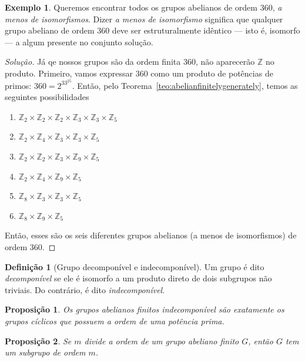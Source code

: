 \documentclass[a4paper,12pt]{report}
\theoremstyle{plain}
\newtheorem{proposicao}{Proposição}[section]
\theoremstyle{definition}
\newtheorem{definicao}{Definição}[section]
\newtheorem{exemplo}{Exemplo}[section]
\newenvironment{solucao}
{\renewcommand\qedsymbol{$\triangle$}\begin{proof}[Solução]}{\end{proof}}
\begin{document}
	\begin{exemplo}
		Queremos encontrar todos os grupos abelianos de ordem 360, \emph{a menos de isomorfismos}. Dizer \emph{a menos de isomorfismo} significa que qualquer grupo abeliano de ordem 360 deve ser estruturalmente idêntico --- isto é, isomorfo --- a algum presente no conjunto solução.
		\begin{solucao}
			Já qe nossos grupos são da ordem finita 360, não aparecerão $\mathbb{Z}$ no produto. Primeiro, vamos expressar 360 como um produto de potências de primos: $360 = 2^33^25$. Então, pelo Teorema~\ref{teo:abelianfinitelygenerately}, temos as seguintes possibilidades
			\begin{enumerate}
				\item $\mathbb{Z}_2\times\mathbb{Z}_2\times\mathbb{Z}_2\times\mathbb{Z}_3\times\mathbb{Z}_3\times\mathbb{Z}_5$
				\item 	$\mathbb{Z}_2\times\mathbb{Z}_4\times\mathbb{Z}_3\times\mathbb{Z}_3\times\mathbb{Z}_5$ 
				\item 	$\mathbb{Z}_2\times\mathbb{Z}_2\times\mathbb{Z}_3\times\mathbb{Z}_9\times\mathbb{Z}_5$ 
				\item $\mathbb{Z}_2\times\mathbb{Z}_4\times\mathbb{Z}_9\times\mathbb{Z}_5$
				\item $\mathbb{Z}_8\times\mathbb{Z}_3\times\mathbb{Z}_3\times\mathbb{Z}_5$ 
				\item $\mathbb{Z}_8\times\mathbb{Z}_9\times\mathbb{Z}_5$ 
			\end{enumerate}
			
		Então, esses são os seis diferentes grupos abelianos (a menos de isomorfismos) de ordem 360.
		\end{solucao}
	\end{exemplo}
	
	\begin{definicao}[Grupo decomponível e indecomponível]
		Um grupo é dito \emph{decomponível} se ele é isomorfo a um produto direto de dois subgrupos não triviais. Do contrário, é dito \emph{indecomponível}.
	\end{definicao}
	
	\begin{proposicao}
		Os grupos abelianos finitos indecomponível são exatamente os grupos cíclicos que possuem a ordem de uma potência prima.
	\end{proposicao}
	
	\begin{proposicao}
		Se $m$ divide a ordem de um grupo abeliano finito $G$, então $G$ tem um subgrupo de ordem $m$.	
	\end{proposicao}
	
\end{document}
